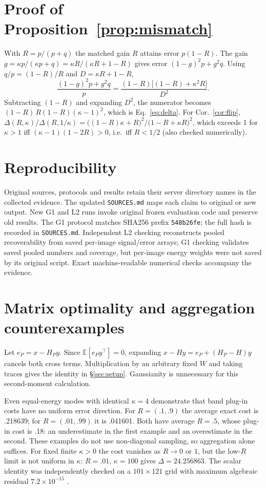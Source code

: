 \section{Proof of Proposition~\ref{prop:mismatch}}\label{app:proof}
With $R=p/(p+q)$ the matched gain $R$ attains error $p(1-R)$. The gain
$g=\kappa p/(\kappa p+q)=\kappa R/(\kappa R+1-R)$ gives error
$(1-g)^2p+g^2q$. Using $q/p=(1-R)/R$ and $D=\kappa R+1-R$,
\[
\frac{(1-g)^2p+g^2q}{p}=\frac{(1-R)\big[(1-R)+\kappa^2R\big]}{D^2}.
\]
Subtracting $(1-R)$ and expanding $D^2$, the numerator becomes
$(1-R)\,R(1-R)(\kappa-1)^2$, which is Eq.~\eqref{eq:delta}.
For Cor.~\ref{cor:flip},
$\Delta(R,\kappa)/\Delta(R,1/\kappa)=\big((1-R)\kappa+R\big)^2/\big(1-R+\kappa R\big)^2$,
which exceeds 1 for $\kappa>1$ iff $(\kappa-1)(1-2R)>0$, i.e.\ iff $R<1/2$
(also checked numerically).

\section{Reproducibility}
Original sources, protocols and results retain their server directory
names in the collected evidence. The updated \texttt{SOURCES.md} maps each
claim to original or new output. New G1 and L2 runs invoke original frozen
evaluation code and preserve old results. The G1 protocol matches SHA256
prefix \texttt{548b26fe}; the full hash is recorded in \texttt{SOURCES.md}.
Independent L2 checking reconstructs pooled recoverability from saved
per-image signal/error arrays; G1 checking validates saved pooled numbers
and coverage, but per-image energy weights were not saved by its original
script. Exact machine-readable numerical checks accompany the evidence.

\section{Matrix optimality and aggregation counterexamples}
Let $e_P=x-H_Py$. Since $\mathbb E[e_Py^\top]=0$, expanding
$x-Hy=e_P+(H_P-H)y$ cancels both cross terms. Multiplication by an arbitrary
fixed $W$ and taking traces gives the identity in \S\ref{sec:setup}.
Gaussianity is unnecessary for this second-moment calculation.

Even equal-energy modes with identical $\kappa=4$ demonstrate that band
plug-in costs have no uniform error direction. For $R=(.1,.9)$ the average
exact cost is .218639; for $R=(.01,.99)$ it is .041601. Both have average
$R=.5$, whose plug-in cost is .18: an underestimate in the first example
and an overestimate in the second. These examples do not use non-diagonal
sampling, so aggregation alone suffices. For fixed finite $\kappa>0$ the
cost vanishes as $R\to0$ or $1$, but the low-$R$ limit is not uniform in
$\kappa$: $R=.01$, $\kappa=100$ gives $\Delta=24.256863$.
The scalar identity was independently checked on a $101\times121$ grid
with maximum algebraic residual $7.2\times10^{-15}$ .


